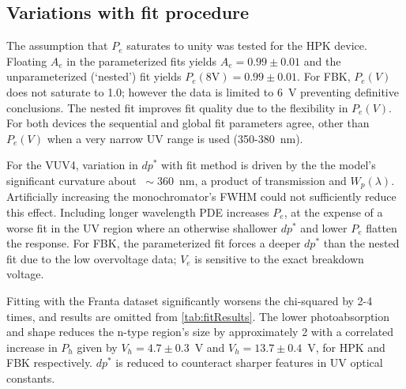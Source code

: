 \subsection{Variations with fit procedure}
The assumption that $P_e$ saturates to unity was tested for the HPK device. Floating $A_e$ in the parameterized fits yields $A_e = 0.99\pm 0.01$ and the unparameterized (`nested') fit yields $P_e(8\text{V}) = 0.99 \pm 0.01$. For FBK, $P_e(V)$ does not saturate to 1.0; however the data is limited to 6~V preventing definitive conclusions. The nested fit improves fit quality due to the flexibility in $P_e(V)$. For both devices the sequential and global fit parameters agree, other than $P_e(V)$ when a very narrow UV range is used (350-380~nm).

For the VUV4, variation in $dp^*$ with fit method is driven by the the model's significant curvature about $~\sim$360~nm, a product of transmission and $W_p(\lambda)$. Artificially increasing the monochromator's FWHM could not sufficiently reduce this effect. Including longer wavelength PDE increases $P_e$, at the expense of a worse fit in the UV region where an otherwise shallower $dp^*$ and lower $P_e$ flatten the response. For FBK, the parameterized fit forces a deeper $dp^*$ than the nested fit due to the low overvoltage data; $V_e$ is sensitive to the exact breakdown voltage.

Fitting with the Franta dataset significantly worsens the chi-squared by 2-4 times, and results are omitted from \autoref{tab:fitResults}. The lower photoabsorption and shape reduces the n-type region's size by approximately 2 with a correlated increase in $P_h$ given by $V_h = 4.7\pm 0.3$~V and $V_h = 13.7 \pm 0.4$~V, for HPK and FBK respectively. $dp^*$ is reduced to counteract sharper features in UV optical constants.

